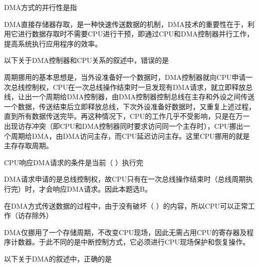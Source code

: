 \question DMA方式的并行性是指
\par{}
\begin{solution}DMA直接存储器存取，是一种快速传送数据的机制，DMA技术的重要性在于，利用它进行数据存取时不需要CPU进行干预，即通过CPU和DMA控制器并行工作，提高系统执行应用程序的效率。
\end{solution}
\question 以下关于DMA控制器和CPU关系的叙述中，错误的是
\par{}
\begin{solution}周期挪用的基本思想是，当外设准备好一个数据时，DMA控制器就向CPU申请一次总线控制权，CPU在一次总线操作结束时一旦发现有DMA请求，就立即释放总线，让出一个周期给DMA控制器，由DMA控制器控制总线在主存和外设之间传送一个数据，传送结束后立即释放总线，下次外设准备好数据时，又重复上述过程，直到所有数据传送完毕。再这种情况下，CPU的工作几乎不受影响，只是在万一出现访存冲突（即CPU和DMA控制器同时要求访问同一个主存时），CPU挪出一个周期给DMA，由DMA访问主存，而CPU延迟访问主存。这里CPU挪用的就是主存存取周期。
\end{solution}
\question CPU响应DMA请求的条件是当前（ ）执行完
\par{}
\begin{solution}DMA请求申请的是总线控制权，故CPU只有在一次总线操作结束时（总线周期执行完）时，才会响应DMA请求。因此本题选B。
\end{solution}
\question 在DMA方式传送数据的过程中，由于没有破坏（
）的内容，所以CPU可以正常工作（访存除外）
\par{}
\begin{solution}DMA仅挪用了一个存储周期，不改变CPU现场，因此无需占用CPU的寄存器及程序计数器。于此不同的是中断控制方式，它必须进行CPU现场保护和恢复操作。
\end{solution}
\question 以下关于DMA的叙述中，正确的是
\par{}
